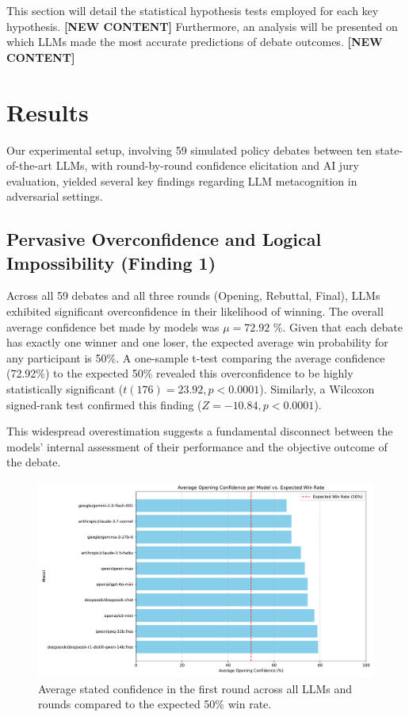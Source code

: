\documentclass{article}
\begin{document}
This section will detail the statistical hypothesis tests employed for each key hypothesis. \textbf{[NEW CONTENT]}
Furthermore, an analysis will be presented on which LLMs made the most accurate predictions of debate outcomes. \textbf{[NEW CONTENT]}

\section{Results}
\label{sec:results}

\lstset{style=promptstyle} %

Our experimental setup, involving 59 simulated policy debates between ten state-of-the-art LLMs, with round-by-round confidence elicitation and AI jury evaluation, yielded several key findings regarding LLM metacognition in adversarial settings.

\subsection{Pervasive Overconfidence and Logical Impossibility (Finding 1)}

Across all 59 debates and all three rounds (Opening, Rebuttal, Final), LLMs exhibited significant overconfidence in their likelihood of winning. The overall average confidence bet made by models was $\mu = 72.92$ \%. Given that each debate has exactly one winner and one loser, the expected average win probability for any participant is 50\%. A one-sample t-test comparing the average confidence (72.92\%) to the expected 50\% revealed this overconfidence to be highly statistically significant ($t(176) = 23.92, p < 0.0001$). Similarly, a Wilcoxon signed-rank test confirmed this finding ($Z= -10.84, p < 0.0001$).

This widespread overestimation suggests a fundamental disconnect between the models' internal assessment of their performance and the objective outcome of the debate.

\begin{figure}[h]
  \centering
  \includegraphics[width=0.8\linewidth]{figures/model_avg_opening_confidence_bar_chart.pdf}
  \caption{Average stated confidence in the first round across all LLMs and rounds compared to the expected 50\% win rate.}
  \label{fig:avg_confidence}
\end{figure}
\end{document}
